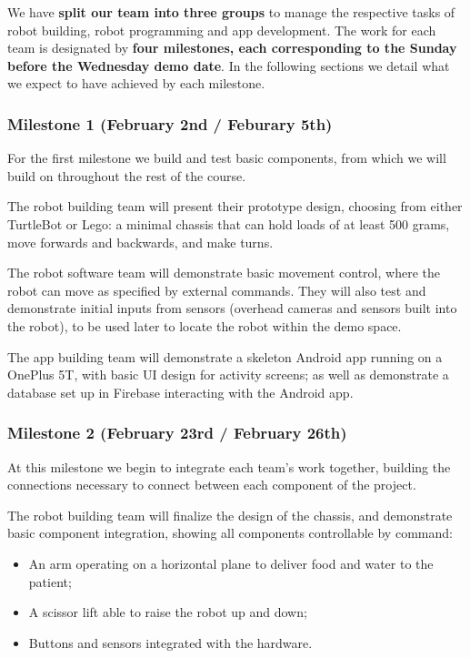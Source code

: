 \documentclass{article}
\begin{document}
We have {\bf split our team into three groups} to manage the respective tasks of robot building, robot programming and app development. The work for each team is designated by {\bf four milestones, each corresponding to the Sunday before the Wednesday demo date}. In the following sections we detail what we expect to have achieved by each milestone. 

\subsubsection{Milestone 1 (February 2nd / Feburary 5th)}
For the first milestone we build and test basic components, from which we will build on throughout the rest of the course. 

The robot building team will present their prototype design, choosing from either TurtleBot or Lego: a minimal chassis that can hold loads of at least 500 grams, move forwards and backwards, and make turns.

The robot software team will demonstrate basic movement control, where the robot can move as specified by external commands. They will also test and demonstrate initial inputs from sensors (overhead cameras and sensors built into the robot), to be used later to locate the robot within the demo space.

The app building team will demonstrate a skeleton Android app running on a OnePlus 5T, with basic UI design for activity screens; as well as demonstrate a database set up in Firebase interacting with the Android app. 

\subsubsection{Milestone 2 (February 23rd / February 26th)}
At this milestone we begin to integrate each team's work together, building the connections necessary to connect between each component of the project. 

The robot building team will finalize the design of the chassis, and demonstrate basic component integration, showing all components controllable by command:
\begin{itemize}
\item An arm operating on a horizontal plane to deliver food and water to the patient;
\item A scissor lift able to raise the robot up and down;
\item Buttons and sensors integrated with the hardware.
\end{itemize}
\end{document}
